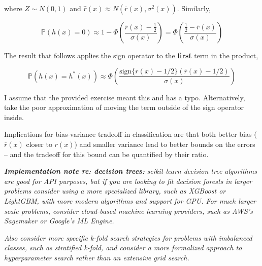 where \(Z \sim N(0, 1)\) and
\(\hat{r}(x) \approx N(\overline{r}(x), \sigma^2(x))\). Similarly,

\[ \mathbb{P}(h(x) = 0) \approx 1 - \Phi\left( \frac{\overline{r}(x) - \frac{1}{2}}{\sigma(x)} \right) = \Phi\left( \frac{\frac{1}{2} - \overline{r}(x)}{\sigma(x)} \right)\]

The result that follows applies the sign operator to the \textbf{first}
term in the product,

\[ \mathbb{P}(h(x) = h^*(x)) \approx \Phi \left( \frac{\text{sign} \Big\{ r(x) - 1/2 \Big\} (\overline{r}(x) - 1/2) }{\sigma(x)} \right) \]

I assume that the provided exercise meant this and has a typo.
Alternatively, take the poor approximation of moving the term outside of
the sign operator inside.

Implications for bias-variance tradeoff in classification are that both
better bias (\(\overline{r}(x)\) closer to \(r(x)\)) and smaller
variance lead to better bounds on the errors -- and the tradeoff for
this bound can be quantified by their ratio.

\textbf{\emph{Implementation note re: decision trees:}}
\emph{scikit-learn decision tree algorithms are good for API purposes,
but if you are looking to fit decision forests in larger problems
consider using a more specialized library, such as XGBoost or LightGBM,
with more modern algorithms and support for GPU. For much larger scale
problems, consider cloud-based machine learning providers, such as AWS's
Sagemaker or Google's ML Engine.}

\emph{Also consider more specific k-fold search strategies for problems
with imbalanced classes, such as stratified k-fold, and consider a more
formalized approach to hyperparameter search rather than an extensive
grid search.}
